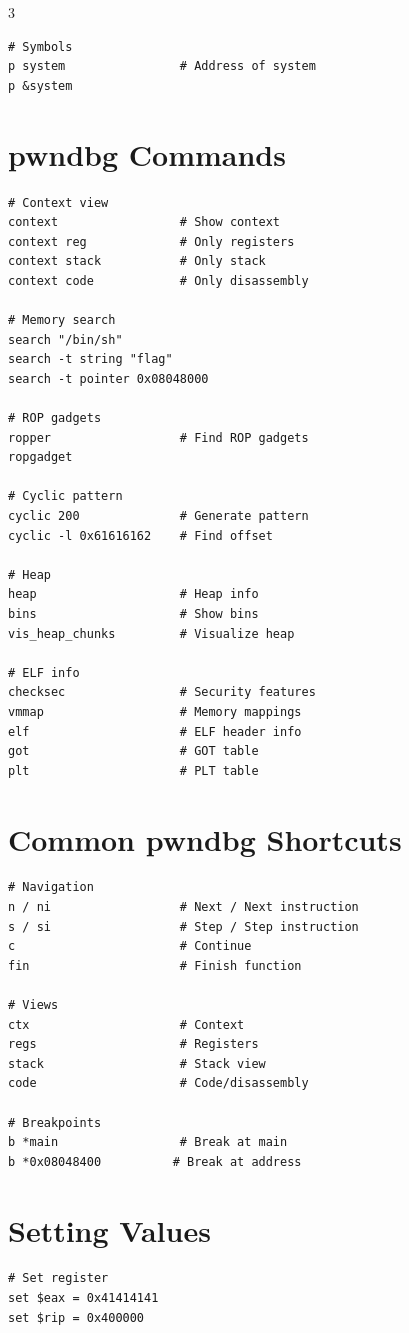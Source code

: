 \documentclass[10pt,landscape,a4paper]{article}
\begin{document}
\begin{multicols}{3}
\begin{lstlisting}
# Symbols
p system                # Address of system
p &system
\end{lstlisting}

\section*{pwndbg Commands}
\begin{lstlisting}
# Context view
context                 # Show context
context reg             # Only registers
context stack           # Only stack
context code            # Only disassembly

# Memory search
search "/bin/sh"
search -t string "flag"
search -t pointer 0x08048000

# ROP gadgets
ropper                  # Find ROP gadgets
ropgadget

# Cyclic pattern
cyclic 200              # Generate pattern
cyclic -l 0x61616162    # Find offset

# Heap
heap                    # Heap info
bins                    # Show bins
vis_heap_chunks         # Visualize heap

# ELF info
checksec                # Security features
vmmap                   # Memory mappings
elf                     # ELF header info
got                     # GOT table
plt                     # PLT table
\end{lstlisting}

\section*{Common pwndbg Shortcuts}
\begin{lstlisting}
# Navigation
n / ni                  # Next / Next instruction
s / si                  # Step / Step instruction
c                       # Continue
fin                     # Finish function

# Views
ctx                     # Context
regs                    # Registers
stack                   # Stack view
code                    # Code/disassembly

# Breakpoints
b *main                 # Break at main
b *0x08048400          # Break at address
\end{lstlisting}

\section*{Setting Values}
\begin{lstlisting}
# Set register
set $eax = 0x41414141
set $rip = 0x400000


\end{lstlisting}
\end{multicols}
\end{document}
